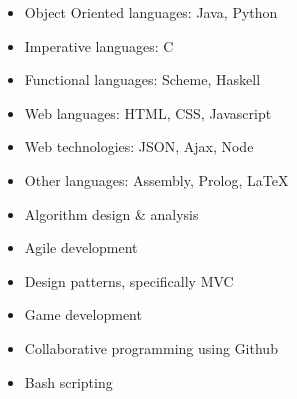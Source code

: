 \documentclass[]{friggeri-cv} %
\begin{document}
\begin{minipage}[t]{0.5\textwidth}
\begin{itemize} \itemsep -2pt
\item{Object Oriented languages: Java, Python}
\item{Imperative languages: C}
\item{Functional languages: Scheme, Haskell}
\item{Web languages: HTML, CSS, Javascript}
\item{Web technologies: JSON, Ajax, Node}
\item{Other languages: Assembly, Prolog, \LaTeX}
\end{itemize}
\end{minipage}
\begin{minipage}[t]{0.5\textwidth}
\begin{itemize} \itemsep -2pt
\item{Algorithm design \& analysis}
\item{Agile development}
\item{Design patterns, specifically MVC}
\item{Game development}
\item{Collaborative programming using Github}
\item{Bash scripting}
\end{itemize}
\end{minipage}


\end{document}
